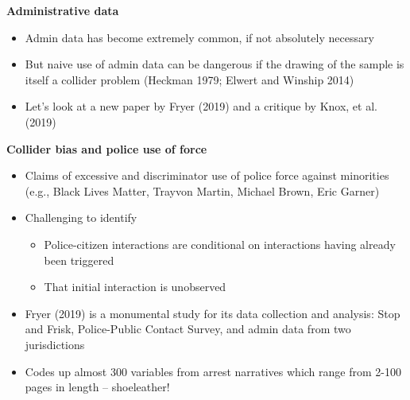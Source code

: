 \documentclass[notes=show]{beamer}
\begin{document}
\begin{frame}[plain]
\begin{center}
\textbf{Administrative data}
\end{center}

\begin{itemize}
\item Admin data has become extremely common, if not absolutely necessary 
\item But naive use of admin data can be dangerous if the drawing of the sample is itself a collider problem (Heckman 1979; Elwert and Winship 2014)
\item Let's look at a new paper by Fryer (2019) and a critique by Knox, et al. (2019)
\end{itemize}

\end{frame}

\begin{frame}[plain]
\begin{center}
\textbf{Collider bias and police use of force}
\end{center}

\begin{itemize}
\item Claims of excessive and discriminator use of police force against minorities (e.g., Black Lives Matter, Trayvon Martin, Michael Brown, Eric Garner)
\item Challenging to identify
	\begin{itemize}
	\item Police-citizen interactions are conditional on interactions having already been triggered
	\item That initial interaction is unobserved
	\end{itemize}
\item Fryer (2019) is a monumental study for its data collection and analysis: Stop and Frisk, Police-Public Contact Survey, and admin data from two jurisdictions
\item Codes up almost 300 variables from arrest narratives which range from 2-100 pages in length -- shoeleather!
\end{itemize}

\end{frame}
\end{document}
